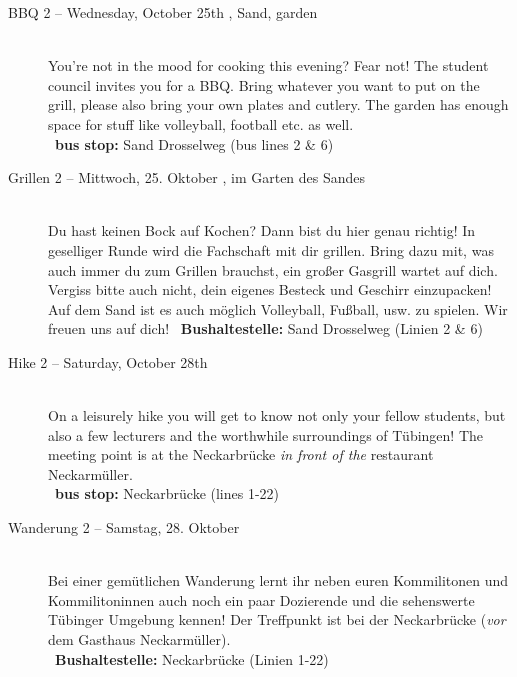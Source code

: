 \begin{description}
\ifml
	\item[BBQ 2 -- Wednesday, October 25th \YEAR, Sand, garden]~\\%
	You're not in the mood for cooking this evening? Fear not!
    The student council invites you for a BBQ. Bring whatever you want to put on the grill,
    please also bring your own plates and cutlery. The garden has enough space for stuff like volleyball, football etc. as well.\\
	~\textbf{bus stop:} Sand Drosselweg (bus lines 2 \& 6)
\else
	\item[Grillen 2 -- Mittwoch, 25. Oktober \YEAR, im Garten des Sandes]~\\%
	Du hast keinen Bock auf Kochen? Dann bist du hier genau richtig! In geselliger Runde wird die Fachschaft mit dir grillen.
	Bring dazu mit, was auch immer du zum Grillen brauchst, ein großer Gasgrill wartet auf dich. Vergiss bitte auch nicht, dein eigenes Besteck und Geschirr einzupacken!\\
	Auf dem Sand ist es auch möglich Volleyball, Fußball, usw. zu spielen. Wir freuen uns auf dich!
	~\textbf{Bushaltestelle:} Sand Drosselweg (Linien 2 \& 6)
\fi

\ifml
	\item[Hike 2 -- Saturday, October 28th \YEAR]~\\%
	On a leisurely hike you will get to know not only your fellow students,
	but also a few lecturers and the worthwhile surroundings of Tübingen!
	The meeting point is at the Neckarbrücke \emph{in front of the} restaurant \glqq Neckarmüller\grqq. \\
	~\textbf{bus stop:} Neckarbrücke (lines 1-22)
\else
	\item[Wanderung 2 -- Samstag, 28. Oktober \YEAR]~\\%
	Bei einer gemütlichen Wanderung lernt ihr neben euren Kommilitonen und Kommilitoninnen auch
	noch ein paar Dozierende und die sehenswerte Tübinger Umgebung kennen!
	Der Treffpunkt ist bei der Neckarbrücke (\emph{vor} dem Gasthaus \glqq Neckarmüller\grqq).\\
	~\textbf{Bushaltestelle:} Neckarbrücke (Linien 1-22)
\fi


\end{description}
